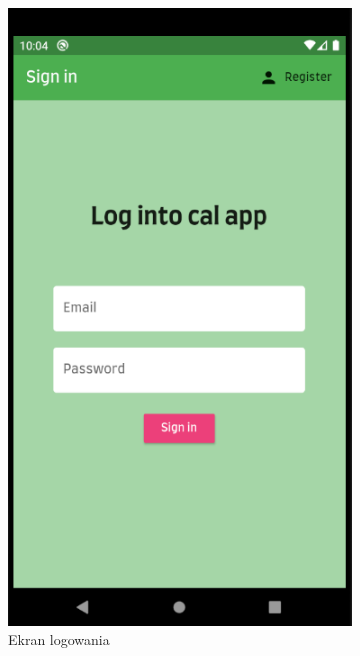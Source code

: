 \documentclass[12pt, a4paper]{article}
\begin{document}
\begin{sloppypar}
{{    \begin{figure}[H]
      \centering
      \begin{subfigure}{.5\textwidth}
        \centering
        \includegraphics[width=.8\linewidth]{screen_login.PNG}
        \caption{Ekran logowania}
        \label{fig:screen_login}
      \end{subfigure}%
      \begin{subfigure}{.5\textwidth}
        \centering

\end{subfigure}
\end{figure}}}
\end{sloppypar}
\end{document}
